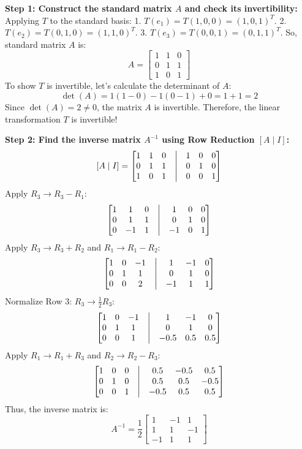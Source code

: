\documentclass[11pt,a4paper]{article}
\begin{document}
\begin{solutionbox}
\textbf{Step 1: Construct the standard matrix $A$ and check its invertibility:}
Applying $T$ to the standard basis:
1. $T(e_1) = T(1,0,0) = (1,0,1)^T$.
2. $T(e_2) = T(0,1,0) = (1,1,0)^T$.
3. $T(e_3) = T(0,0,1) = (0,1,1)^T$.
So, standard matrix $A$ is:
\[ A = \begin{bmatrix} 1 & 1 & 0 \\ 0 & 1 & 1 \\ 1 & 0 & 1 \end{bmatrix} \]
To show $T$ is invertible, let's calculate the determinant of $A$:
\[ \det(A) = 1(1 - 0) - 1(0 - 1) + 0 = 1 + 1 = 2 \]
Since $\det(A) = 2 \neq 0$, the matrix $A$ is invertible. Therefore, the linear transformation $T$ is invertible!

\textbf{Step 2: Find the inverse matrix $A^{-1}$ using Row Reduction $[A \mid I]$:}
\[ [A \mid I] = \begin{bmatrix} 1 & 1 & 0 & \bigm| & 1 & 0 & 0 \\ 0 & 1 & 1 & \bigm| & 0 & 1 & 0 \\ 1 & 0 & 1 & \bigm| & 0 & 0 & 1 \end{bmatrix} \]
Apply $R_3 \to R_3 - R_1$:
\[ \begin{bmatrix} 1 & 1 & 0 & \bigm| & 1 & 0 & 0 \\ 0 & 1 & 1 & \bigm| & 0 & 1 & 0 \\ 0 & -1 & 1 & \bigm| & -1 & 0 & 1 \end{bmatrix} \]
Apply $R_3 \to R_3 + R_2$ and $R_1 \to R_1 - R_2$:
\[ \begin{bmatrix} 1 & 0 & -1 & \bigm| & 1 & -1 & 0 \\ 0 & 1 & 1 & \bigm| & 0 & 1 & 0 \\ 0 & 0 & 2 & \bigm| & -1 & 1 & 1 \end{bmatrix} \]
Normalize Row 3: $R_3 \to \frac{1}{2} R_3$:
\[ \begin{bmatrix} 1 & 0 & -1 & \bigm| & 1 & -1 & 0 \\ 0 & 1 & 1 & \bigm| & 0 & 1 & 0 \\ 0 & 0 & 1 & \bigm| & -0.5 & 0.5 & 0.5 \end{bmatrix} \]
Apply $R_1 \to R_1 + R_3$ and $R_2 \to R_2 - R_3$:
\[ \begin{bmatrix} 1 & 0 & 0 & \bigm| & 0.5 & -0.5 & 0.5 \\ 0 & 1 & 0 & \bigm| & 0.5 & 0.5 & -0.5 \\ 0 & 0 & 1 & \bigm| & -0.5 & 0.5 & 0.5 \end{bmatrix} \]
Thus, the inverse matrix is:
\[ A^{-1} = \frac{1}{2} \begin{bmatrix} 1 & -1 & 1 \\ 1 & 1 & -1 \\ -1 & 1 & 1 \end{bmatrix} \]


\end{solutionbox}
\end{document}
